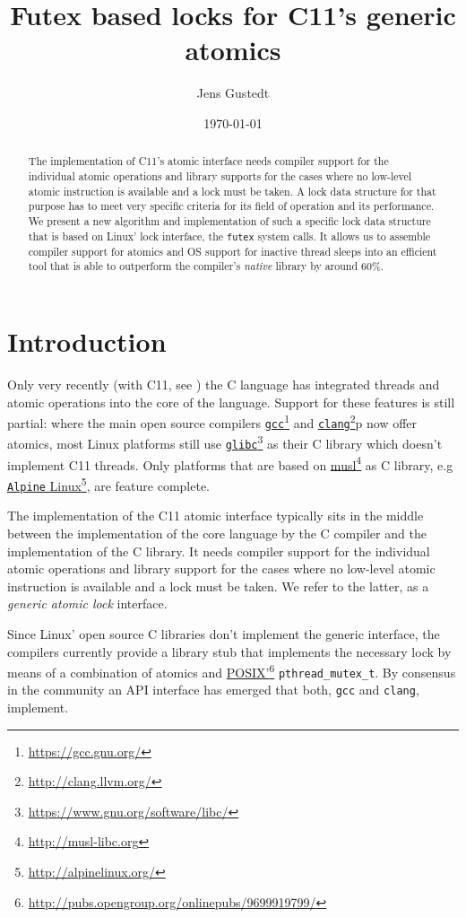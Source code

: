 \documentclass{sig-alternate-05-2015}
\author{Jens Gustedt\\
\affaddr{INRIA and ICube, Universit\'{e} de Strasbourg, France}}
\date{\today}
\title{Futex based locks for C11's generic atomics}
\let\tableofcontents=\relax
\let\oldHref=\href
\def\href#1#2{\oldHref{#1}{#2}\footnote{\url{#1}}}
\begin{document}
\maketitle
\tableofcontents

\begin{abstract}
The implementation of C11's atomic interface needs compiler support
for the individual atomic operations and library supports for the
cases where no low-level atomic instruction is available and a lock
must be taken. A lock data structure for that purpose has to meet
very specific criteria for its field of operation and its
performance. We present a new algorithm and implementation of such a
specific lock data structure that is based on Linux' lock interface,
the \texttt{futex} system calls. It allows us to assemble compiler support
for atomics and OS support for inactive thread sleeps into an
efficient tool that is able to outperform the compiler's \emph{native}
library by around 60\%.
\end{abstract}

\section{Introduction}
\label{sec-1}

Only very recently (with C11, see \cite{C11}) the C language has
integrated threads and atomic operations into the core of the
language.  Support for these features is still partial: where the
main open source compilers \href{https://gcc.gnu.org/}{\texttt{gcc}} and
\href{http://clang.llvm.org/}{\texttt{clang}}p now offer atomics, most Linux
platforms still use \href{https://www.gnu.org/software/libc/}{\texttt{glibc}}
as their C library which doesn't implement C11 threads. Only
platforms that are based on \href{http://musl-libc.org}{musl} as C
library, e.g \href{http://alpinelinux.org/}{\texttt{Alpine} Linux}, are
feature complete.

The implementation of the C11 atomic interface typically sits in the
middle between the implementation of the core language by the C
compiler and the implementation of the C library. It needs compiler
support for the individual atomic operations and library support for
the cases where no low-level atomic instruction is available and a
lock must be taken. We refer to the latter, as a \emph{generic atomic
lock} interface.

Since Linux' open source C libraries don't implement the generic
interface, the compilers currently provide a library stub that
implements the necessary lock by means of a combination of atomics
and \href{http://pubs.opengroup.org/onlinepubs/9699919799/}{POSIX'}
\texttt{pthread\_mutex\_t}. By consensus in the community an API interface
has emerged that both, \texttt{gcc} and \texttt{clang}, implement.
\end{document}
